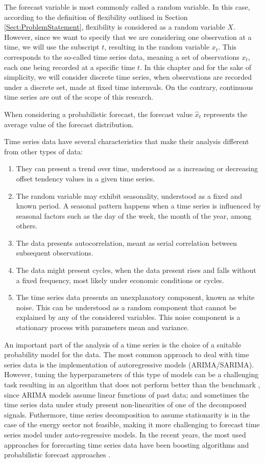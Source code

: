The forecast variable is most commonly called a random variable. In this case, according to the definition of flexibility outlined in Section \ref{Sect:ProblemStatement}, flexibility is considered as a random variable $X$. However, since we want to specify that we are considering one observation at a time, we will use the subscript $t$, resulting in the random variable $x_t$. This corresponds to the so-called time series data, meaning a set of observations $x_t$, each one being recorded at a specific time $t$. In this chapter and for the sake of simplicity, we will consider discrete time series, when observations are recorded under a discrete set, made at fixed time internvals. On the contrary, continuous time series are out of the scope of this research. 

When considering a probabilistic forecast, the forecast value $\hat{x}_t$ represents the average value of the forecast distribution.

Time series data have several characteristics that make their analysis different from other types of data: 
\begin{enumerate}
\item They can present a trend over time, understood as a increasing or decreasing offset tendency values in a given time series. 
\item The random variable may exhibit seasonality, understood as a fixed and known period. A seasonal pattern happens when a time series is influenced by seasonal factors such as the day of the week, the month of the year, among others. 
\item The data presents autocorrelation, meant as serial correlation between subsequent observations. 
\item The data might present cycles, when the data present rises and falls without a fixed frequency, most likely under economic conditions or cycles. 
\item The time series data presents an unexplanatory component, known as white noise. This can be understood as a random component that cannot be explained by any of the considered variables. This noise component is a stationary process with parameters mean and variance. 
\end{enumerate} 

An important part of the analysis of a time series is the choice of a suitable probability model for the data. The most common approach to deal with time series data is the implementation of autoregressive models (ARIMA/SARIMA). However, tuning the hyperparameters of this type of models can be a challenging task resulting in an algorithm that does not perform better than the benchmark \cite{nonlinearARIMA}, since ARIMA models assume linear functions of past data; and sometimes the time series data under study present non-linearities of one of the decomposed signals. Futhermore, time series decomposition to assume stationarity is in the case of the energy sector not feasible, making it more challenging to forecast time series model under auto-regressive models. In the recent years, the most used approaches for forecasting time series data have been boosting algorithms and probabilistic forecast approaches \cite{Robinzonov2010, Barrow2016, Taieb2017, Guen2020}.  

